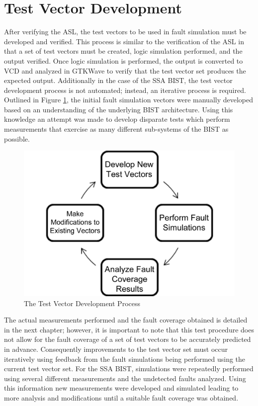 \documentclass[12pt]{report}
\begin{document}
\section{Test Vector Development}
After verifying the ASL, the test vectors to be used in fault simulation must be developed and verified.  This process is similar to the verification of the ASL in that a set of test vectors must be created, logic simulation performed, and the output verified.  Once logic simulation is performed, the output is converted to VCD and analyzed in GTKWave to verify that the test vector set produces the expected output.  Additionally in the case of the SSA BIST, the test vector development process is not automated; instead, an iterative process is required.  Outlined in Figure \ref{fig:testdevproc}, the initial fault simulation vectors were manually developed based on an understanding of the underlying BIST architecture. Using this knowledge an attempt was made to develop disparate tests which perform measurements that exercise as many different sub-systems of the BIST as possible.
\begin{figure}
  \begin{center}
		\includegraphics[scale=.15]{images/process-flowchart}
  \end{center}
  \caption{The Test Vector Development Process}
  \label{fig:testdevproc}
\end{figure}
The actual measurements performed and the fault coverage obtained is detailed in the next chapter; however, it is important to note that this test procedure does not allow for the fault coverage of a set of test vectors to be accurately predicted in advance.  Consequently improvements to the test vector set must occur iteratively using feedback from the fault simulations being performed using the current test vector set.  For the SSA BIST, simulations were repeatedly performed using several different measurements and the undetected faults analyzed.  Using this information new measurements were developed and simulated leading to more analysis and modifications until a suitable fault coverage was obtained.
\end{document}
